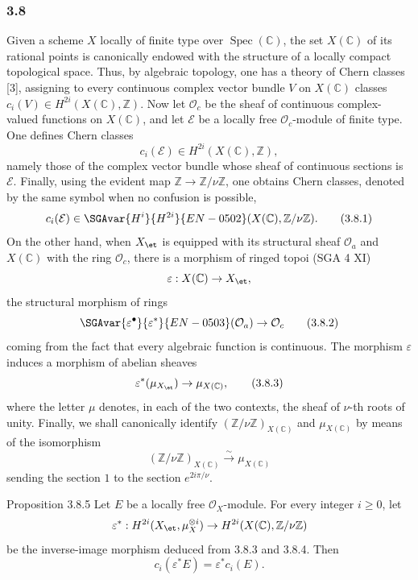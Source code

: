 \subsubsection*{3.8}
Given a scheme $X$ locally of finite type over $\operatorname{Spec}(\mathbb C)$, the set $X(\mathbb C)$ of its rational points is canonically endowed with the structure of a locally compact topological space. Thus, by algebraic topology, one has a theory of Chern classes [3], assigning to every continuous complex vector bundle $V$ on $X(\mathbb C)$ classes $c_i(V)\in H^{2i}(X(\mathbb C),\mathbb Z)$. Now let $\mathcal O_c$ be the sheaf of continuous complex-valued functions on $X(\mathbb C)$, and let $\mathcal E$ be a locally free $\mathcal O_c$-module of finite type. One defines Chern classes
\[
c_i(\mathcal E)\in H^{2i}(X(\mathbb C),\mathbb Z),
\]
namely those of the complex vector bundle whose sheaf of continuous sections is $\mathcal E$. Finally, using the evident map $\mathbb Z\to\mathbb Z/\nu\mathbb Z$, one obtains Chern classes, denoted by the same symbol when no confusion is possible,
\[
c_i(\mathcal E)\in \SGAvar{H^{i}}{H^{2i}}{EN-0502}(X(\mathbb C),\mathbb Z/\nu\mathbb Z).
\tag{3.8.1}
\]
On the other hand, when $X_{\et}$ is equipped with its structural sheaf $\mathcal O_a$ and $X(\mathbb C)$ with the ring $\mathcal O_c$, there is a morphism of ringed topoi (SGA 4 XI)
\[
\varepsilon:X(\mathbb C)\to X_{\et},
\]
the structural morphism of rings
\[
\SGAvar{\varepsilon^\bullet}{\varepsilon^*}{EN-0503}(\mathcal O_a)\to\mathcal O_c
\tag{3.8.2}
\]
coming from the fact that every algebraic function is continuous. The morphism $\varepsilon$ induces a morphism of abelian sheaves
\[
\varepsilon^*(\mu_{X_{\et}})\to \mu_{X(\mathbb C)},
\tag{3.8.3}
\]
where the letter $\mu$ denotes, in each of the two contexts, the sheaf of $\nu$-th roots of unity. Finally, we shall canonically identify $(\mathbb Z/\nu\mathbb Z)_{X(\mathbb C)}$ and $\mu_{X(\mathbb C)}$ by means of the isomorphism
\[
(\mathbb Z/\nu\mathbb Z)_{X(\mathbb C)}
 \xrightarrow{\sim}\mu_{X(\mathbb C)}
\tag{3.8.4}
\]
sending the section $1$ to the section $e^{2i\pi/\nu}$.

\begin{statement}{Proposition 3.8.5}
Let $E$ be a locally free $\mathcal O_X$-module. For every integer $i\ge0$, let
\[
\varepsilon^*:H^{2i}(X_{\et},\mu_X^{\otimes i})
\to H^{2i}(X(\mathbb C),\mathbb Z/\nu\mathbb Z)
\]
be the inverse-image morphism deduced from 3.8.3 and 3.8.4. Then
\[
c_i(\varepsilon^*E)=\varepsilon^*c_i(E).
\]
\end{statement}


